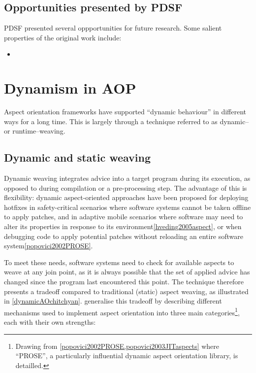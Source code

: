 \subsection{Opportunities presented by PDSF}

PDSF presented several oppportunities for future research. Some salient
properties of the original work include:

\begin{itemize}
    \item 
\end{itemize}

\section{Dynamism in AOP}

Aspect orientation frameworks have supported ``dynamic behaviour'' in different
ways for a long time. This is largely through a technique referred to as dynamic–
or runtime–weaving.

\subsection{Dynamic and static weaving}

Dynamic weaving integrates advice into a target program during its execution, as
opposed to during compilation or a pre-processing step. The advantage of this is
flexibility: dynamic aspect-oriented approaches have been proposed for deploying
hotfixes in safety-critical scenarios where software systems cannot be taken
offline to apply patches, and in adaptive mobile scenarios where software
may need to alter its properties in response to its
environment\cref{hveding2005aspect}, or when debugging code to apply potential
patches without reloading an entire software system\cref{popovici2002PROSE}.

To meet these needs, software systems need to check for available aspects to
weave at any join point, as it is always possible that the set of applied advice
has changed since the program last encountered this point. The technique
therefore presents a tradeoff compared to traditional (static) aspect weaving,
as illustrated in \cref{dynamicAOchitchyan}. \citeauthor{dynamicAOchitchyan}
generalise this tradeoff by describing different mechanisms used to implement
aspect orientation into three main categories\footnote{Drawing from
\cref{popovici2002PROSE,popovici2003JITaspects} where ``PROSE'', a particularly
influential dynamic aspect orientation library, is detailled.}, each with their own
strengths:

